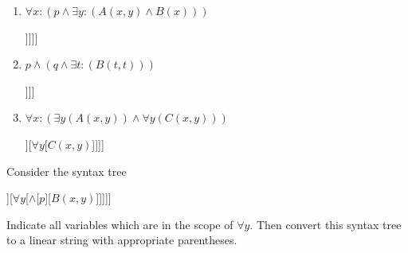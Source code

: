 \begin{solutions}
	\begin{enumerate}
		\item $\forall x:  (p \wedge \exists y: (A(x,y) \wedge B(x)))$
		
		\begin{center}
			\begin{forest}
				[\(\forall x\)[\(\wedge\)[\(p\)][\(\exists y\)[\(\wedge\)[\({A(x,y)}\)][\(B(x)\)]]]]]
			\end{forest}
		\end{center}
	

	
		\item $p \wedge (q \wedge \exists t: (B(t,t)) )$
		
		\begin{center}
			\begin{forest}
				[\(\wedge\)[\(p\)][\(\wedge\)[\(q\)][\(\exists t\)[\({B(t,t)}\)]]]]
			\end{forest}
		
		\end{center}
		\item $\forall x: ( \exists y (A(x,y)) \wedge \forall y (C(x,y)))$
		
		\begin{center}
			\begin{forest}
				[\(\forall x\)[\(\wedge\)[\(\exists y\)[\({A(x,y)}\)]][\(\forall y\)[\({C(x,y)}\)]]]]
			\end{forest}
	
		\end{center}
		
	\end{enumerate}
\end{solutions}

\begin{xca}
	Consider the syntax tree
	
	\begin{center}
		\begin{forest}
			[$\forall x$[$\wedge$[$\exists y$[${A(x,y)}$]][$\forall y$[$\wedge$[$p$][${B(x,y)}$]]]]]
		\end{forest}
	\end{center}
	
	Indicate all variables which are in the scope of $\forall y$.  Then convert this syntax tree to a linear string with appropriate parentheses. 
	
\end{xca}

